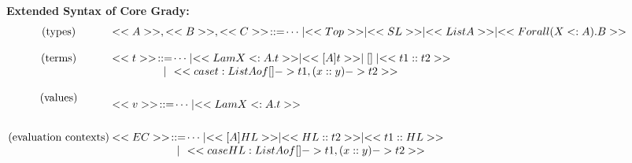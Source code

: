 \begin{figure}
  \begin{mdframed} \footnotesize
    \textbf{Extended Syntax of Core Grady:}\\
    \[
      \setlength{\arraycolsep}{0.6pt}
      \begin{array}{cl}      
        \begin{array}{l}
          \text{(types)}\\
        \end{array}     &
        \begin{array}{lcl}
          <<A>>,<<B>>,<<C>> & ::= & \cdots \mid <<Top>> \mid <<SL>> \mid <<List A>> \mid <<Forall (X <: A).B>> \\
        \end{array}\\\\
                
        \begin{array}{l}
          \text{(terms)}\\\\
        \end{array}     &
        \begin{array}{lcl}
          <<t>> & ::= & \cdots \mid <<Lam X <: A .t >> \mid << [A]t >> \mid [] \mid <<t1 :: t2>> \\
                & \mid & <<case t : List A of [] -> t1, (x :: y) -> t2>>\\
        \end{array}
        \\\\
        \begin{array}{l}
          \text{(values)}\\\\
        \end{array}     &
        \begin{array}{lcl}
          <<v>> & ::=  & \cdots \mid <<Lam X <: A.t>>\\                
        \end{array}
        \\\\
        \begin{array}{lll}
          \text{(evaluation contexts)}\\\\
        \end{array}  &
        \begin{array}{lcl}
          <<EC>> & ::=  & \cdots \mid << [A]HL >> \mid << HL :: t2>> \mid <<t1 :: HL>>\\
                 & \mid & <<case HL : List A of [] -> t1, (x::y) -> t2>>\\
        \end{array}\\\\
        

\end{array}\]
\end{mdframed}
\end{figure}
